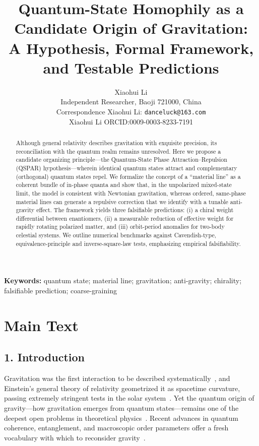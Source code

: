 \documentclass[12pt,a4paper]{article}
\title{
  \textbf{Quantum-State Homophily as a Candidate Origin of Gravitation:}\\
  \textbf{A Hypothesis, Formal Framework, and Testable Predictions}
}
\author{Xiaohui Li\\
Independent Researcher, Baoji 721000, China\\
Correspondence Xiaohui Li: \texttt{danceluck@163.com}\\
Xiaohui Li ORCID:0009-0003-8233-7191
}
\date{}
\begin{document}
\maketitle
\thispagestyle{fancy}


\begin{abstract}
\noindent

Although general relativity describes gravitation with exquisite precision, its reconciliation with the quantum realm remains unresolved. Here we propose a candidate organizing principle---the Quantum-State Phase Attraction--Repulsion (QSPAR) hypothesis---wherein identical quantum states attract and complementary (orthogonal) quantum states repel. We formalize the concept of a ``material line'' as a coherent bundle of in-phase quanta and show that, in the unpolarized mixed-state limit, the model is consistent with Newtonian gravitation, whereas ordered, same-phase material lines can generate a repulsive correction that we identify with a tunable anti-gravity effect. The framework yields three falsifiable predictions: (i) a chiral weight differential between enantiomers, (ii) a measurable reduction of effective weight for rapidly rotating polarized matter, and (iii) orbit-period anomalies for two-body celestial systems. We outline numerical benchmarks against Cavendish-type, equivalence-principle and inverse-square-law tests, emphasizing empirical falsifiability.
\end{abstract}

\vspace{0.5em}
\noindent\textbf{Keywords:} quantum state; material line; gravitation; anti-gravity; chirality; falsifiable prediction; coarse-graining

\section*{Main Text}

\subsection*{1. Introduction}

Gravitation was the first interaction to be described systematically~\cite{newton1687}, and Einstein's general theory of relativity geometrized it as spacetime curvature, passing extremely stringent tests in the solar system~\cite{einstein1916,will2014}. Yet the quantum origin of gravity---how gravitation emerges from quantum states---remains one of the deepest open problems in theoretical physics~\cite{feynman1995}. Recent advances in quantum coherence, entanglement, and macroscopic order parameters offer a fresh vocabulary with which to reconsider gravity~\cite{zurek2003}.
\end{document}
